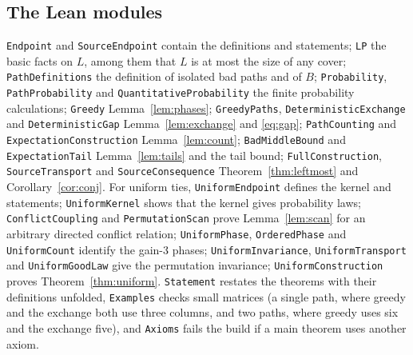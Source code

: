 \documentclass[11pt]{article}
\theoremstyle{remark}
\begin{document}
\begin{appendices}
\section{The Lean modules}\label{app:lean}
{\raggedright

\texttt{Endpoint} and \texttt{SourceEndpoint} contain the definitions and
statements; \texttt{LP} the basic facts on $L$, among them that $L$ is at
most the size of any cover; \texttt{PathDefinitions} the definition of
isolated bad paths and of $B$; \texttt{Probability}, \texttt{PathProbability} and
\texttt{QuantitativeProbability} the finite probability calculations;
\texttt{Greedy} Lemma~\ref{lem:phases}; \texttt{GreedyPaths},
\texttt{DeterministicExchange} and \texttt{DeterministicGap}
Lemma~\ref{lem:exchange} and \eqref{eq:gap}; \texttt{PathCounting} and
\texttt{ExpectationConstruction} Lemma~\ref{lem:count};
\texttt{BadMiddleBound} and \texttt{ExpectationTail}
Lemma~\ref{lem:tails} and the tail bound; \texttt{FullConstruction},
\texttt{SourceTransport} and \texttt{SourceConsequence}
Theorem~\ref{thm:leftmost} and Corollary~\ref{cor:conj}. For uniform ties,
\texttt{UniformEndpoint} defines the kernel and statements;
\texttt{UniformKernel} shows that the kernel gives probability laws;
\texttt{ConflictCoupling} and \texttt{PermutationScan} prove
Lemma~\ref{lem:scan} for an arbitrary directed conflict relation;
\texttt{UniformPhase}, \texttt{OrderedPhase} and \texttt{UniformCount}
identify the gain-$3$ phases; \texttt{UniformInvariance},
\texttt{UniformTransport} and \texttt{UniformGoodLaw} give the permutation
invariance; \texttt{UniformConstruction} proves Theorem~\ref{thm:uniform}.
\texttt{Statement} restates the theorems with their definitions unfolded,
\texttt{Examples} checks small matrices (a single path, where greedy and
the exchange both use three columns, and two paths, where greedy uses six
and the exchange five), and \texttt{Axioms} fails the build if a main
theorem uses another axiom.\par}
\end{appendices}
\end{document}
